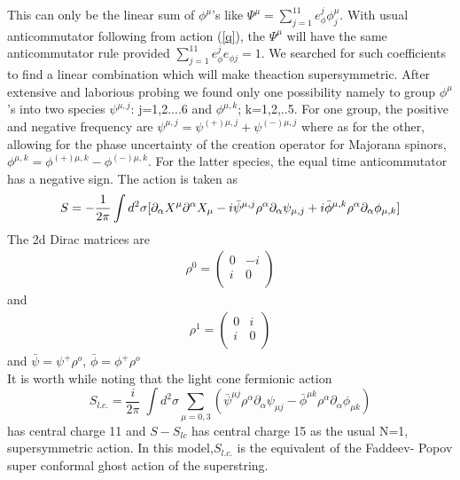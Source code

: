 \documentclass[a4paper,showpacs,preprintnumbers,amsmath,amssymb]{revtex4}
\begin{document}
This can only be the linear sum of $\phi^{\mu}$'s like $\Psi^{\mu}=\sum_{j=1}^{11}
e^j_{\phi}\phi_j^{\mu}$. With usual anticommutator following from action (\ref{q}), the
$\Psi^{\mu}$ will have the same anticommutator rule provided $\sum_{j=1}^{11}e_{\phi}^j
e_{\phi j}=1$. We searched for such coefficients to find a linear combination which will 
make theaction supersymmetric. After extensive and laborious probing we found only one 
possibility namely to group $\phi^{\mu}$'s into two
species $\psi^{\mu,j}$: j=1,2....6 and $\phi^{\mu,k}$; k=1,2,..5. For one group, 
the positive and negative frequency are $\psi^{\mu,j }=\psi^{(+)\mu,j} + 
\psi^{(-)\mu,j}$ where
as for the other, allowing for the phase uncertainty of the creation operator
for Majorana spinors,  $\phi^{\mu,k} = \phi^{(+)\mu,k} - \phi^{(-)\mu,k}$.
For the latter species, the equal time anticommutator has a negative sign. 
The action is taken as
\begin{equation}
S= -\frac{1}{2\pi}\int d^2\sigma [ \partial_{\alpha}X^{\mu}\partial^{\alpha}X_{\mu}
-i \bar{\psi}^{\mu,j}\rho^{\alpha}\partial_{\alpha}  \psi_{\mu,j}
+ i \bar{\phi}^{\mu,k}\rho^{\alpha}\partial_{\alpha}  \phi_{\mu,k}]\label{s}\\
\end{equation}
The 2d Dirac matrices are
\begin{eqnarray}
\rho^0 =
\left ( 
\begin{array}{cc}
0 & -i\\
i & 0\\
\end{array}
\right )
\end{eqnarray}
and
\begin{eqnarray}
\rho^1 =
\left ( 
\begin{array}{cc}
0 & i\\
i & 0\\
\end{array}
\right )
\end{eqnarray}
and $\bar{\psi}=\psi^+\rho^o$, $\bar{\phi}=\phi^+\rho^o$\\
It is worth while noting that the light cone fermionic action
\[ S_{l.c.}=\frac{i}{2\pi}\;\int d^2\sigma \sum_{\mu =0,3}\left( \bar{\psi}^{\mu j}\rho^
{\alpha}\partial_{\alpha}\psi_{\mu j} - \bar{\phi}^{\mu k}\rho^
{\alpha}\partial_{\alpha}\phi_{\mu k}\right) \] has central charge 11 and $S - S_{lc}$ has 
central charge 15 as the usual N=1, supersymmetric action. In this model,$S_{l.c.}$ is the
equivalent of the Faddeev- Popov super conformal ghost action of the superstring.
\end{document}
